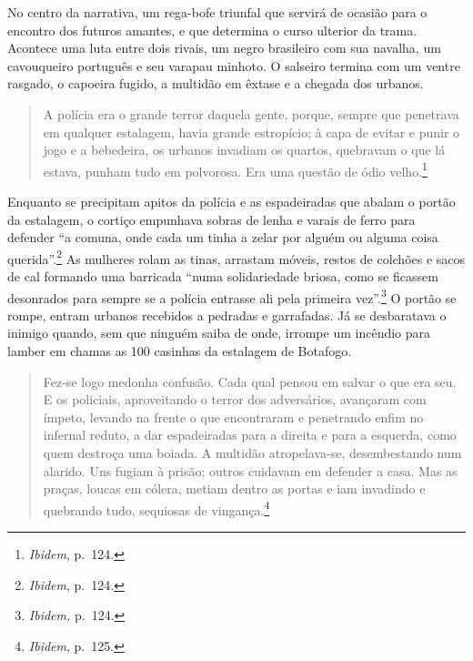 No centro da narrativa, um rega-bofe triunfal que servirá de ocasião
para o encontro dos futuros amantes, e que determina o curso ulterior da
trama. Acontece uma luta entre dois rivais, um negro brasileiro com sua
navalha, um cavouqueiro português e seu varapau minhoto. O salseiro
termina com um ventre rasgado, o capoeira fugido, a multidão em êxtase e
a chegada dos urbanos.

\begin{quote}
A polícia era o grande terror daquela gente, porque, sempre que
penetrava em qualquer estalagem, havia grande estropício; à capa de
evitar e punir o jogo e a bebedeira, os urbanos invadiam os quartos,
quebravam o que lá estava, punham tudo em polvorosa. Era uma questão de
ódio velho.\footnote{\textit{Ibidem}, p.~124.}
\end{quote}

Enquanto se precipitam apitos da polícia e as espadeiradas que abalam o
portão da estalagem, o cortiço empunhava sobras de lenha e varais de
ferro para defender ``a comuna, onde cada um tinha a zelar por alguém ou
alguma coisa querida''.\footnote{\textit{Ibidem}, p.~124.} As mulheres
rolam as tinas, arrastam móveis, restos de colchões e sacos de cal
formando uma barricada ``numa solidariedade briosa, como se ficassem
desonrados para sempre se a polícia entrasse ali pela primeira
vez''.\footnote{\textit{Ibidem,} p.~124.} O portão se rompe, entram
urbanos recebidos a pedradas e garrafadas. Já se desbaratava o inimigo
quando, sem que ninguém saiba de onde, irrompe um incêndio para lamber
em chamas as 100 casinhas da estalagem de Botafogo.

\begin{quote}
Fez-se logo medonha confusão. Cada qual pensou em salvar o que era seu.
E os policiais, aproveitando o terror dos adversários, avançaram com
ímpeto, levando na frente o que encontraram e penetrando enfim no
infernal reduto, a dar espadeiradas para a direita e para a esquerda,
como quem destroça uma boiada. A multidão atropelava-se, desembestando
num alarido. Uns fugiam à prisão; outros cuidavam em defender a casa.
Mas as praças, loucas em cólera, metiam dentro as portas e iam invadindo
e quebrando tudo, sequiosas de vingança.\footnote{\textit{Ibidem}, p.~125.}
\end{quote}

